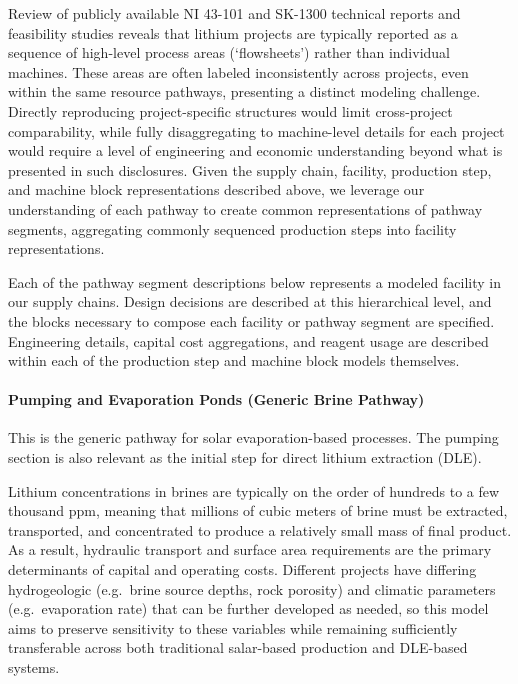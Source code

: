 Review of publicly available NI 43-101 and SK-1300 technical reports and feasibility studies reveals that lithium projects are typically reported as a sequence of high-level process areas (`flowsheets') rather than individual machines. These areas are often labeled inconsistently across projects, even within the same resource pathways, presenting a distinct modeling challenge. Directly reproducing project-specific structures would limit cross-project comparability, while fully disaggregating to machine-level details for each project would require a level of engineering and economic understanding beyond what is presented in such disclosures. Given the supply chain, facility, production step, and machine block representations described above, we leverage our understanding of each pathway to create common representations of pathway segments, aggregating commonly sequenced production steps into facility representations.

Each of the pathway segment descriptions below represents a modeled facility in our supply chains. Design decisions are described at this hierarchical level, and the blocks necessary to compose each facility or pathway segment are specified. Engineering details, capital cost aggregations, and reagent usage are described within each of the production step and machine block models themselves.

\paragraph{Pumping and Evaporation Ponds (Generic Brine Pathway)}\label{app:04-methods-facilitychoices-pumpponds}

This is the generic pathway for solar evaporation-based processes. The pumping section is also relevant as the initial step for direct lithium extraction (DLE).

Lithium concentrations in brines are typically on the order of hundreds to a few thousand ppm, meaning that millions of cubic meters of brine must be extracted, transported, and concentrated to produce a relatively small mass of final product. As a result, hydraulic transport and surface area requirements are the primary determinants of capital and operating costs. Different projects have differing hydrogeologic (e.g.\ brine source depths, rock porosity) and climatic parameters (e.g.\ evaporation rate) that can be further developed as needed, so this model aims to preserve sensitivity to these variables while remaining sufficiently transferable across both traditional salar-based production and DLE-based systems.

